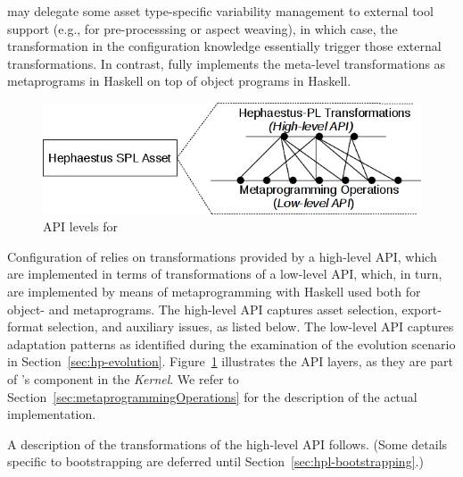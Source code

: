 \hp{} may delegate some asset type-specific variability management to external tool support (e.g., for pre-processsing or aspect weaving), in which case, the transformation in the configuration knowledge essentially trigger those external transformations. In contrast, \hpl{} fully implements the meta-level transformations as metaprograms in Haskell on top of object programs in Haskell.


\begin{figure}[t!]
\includegraphics[scale=0.7]{imagens/apis-hpl-asset.png}
\caption{API levels for \hpsplasset}
\label{fig:hpl-apis}
\end{figure}


Configuration of \hpl{} relies on transformations provided by a high-level API, which are implemented in terms of transformations of a low-level API, which, in turn, are implemented by means of metaprogramming with Haskell used both for object- and metaprograms. The high-level API captures asset selection, export-format selection, and auxiliary issues, as listed below. The low-level API captures adaptation patterns as identified during the examination of the evolution scenario in Section~\ref{sec:hp-evolution}. Figure~\ref{fig:hpl-apis} illustrates the API layers, as they are part of \hpl's component \hpsplasset{} in the \emph{Kernel}. We refer to Section~\ref{sec:metaprogrammingOperations} for the description of the actual implementation.

A description of the transformations of the high-level API follows. (Some details specific to bootstrapping are deferred until Section~\ref{sec:hpl-bootstrapping}.)

